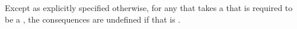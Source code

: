 Except as explicitly specified otherwise,
for any   that takes a 
that is required to be a , 
the consequences are undefined 
if that  is .

\endsubsubsection%

\endsubsection%
